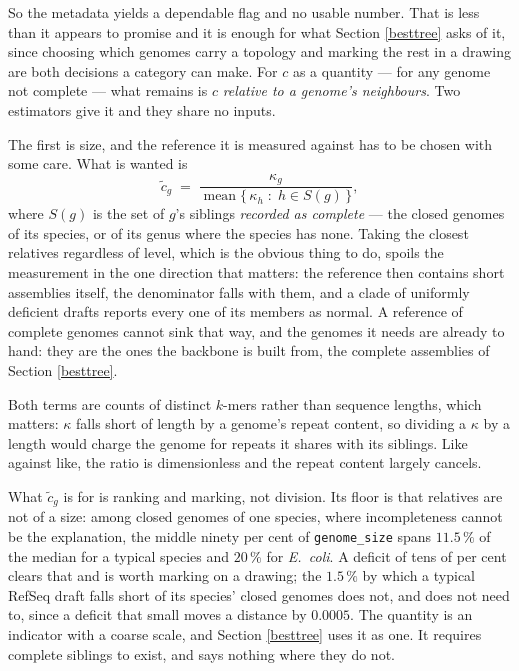 \documentclass[pdflatex,sn-vancouver-num]{sn-jnl}
\begin{document}
So the metadata yields a dependable flag and no usable number. That is less than it appears to promise
and it is enough for what Section \ref{besttree} asks of it, since choosing which genomes carry a
topology and marking the rest in a drawing are both decisions a category can make. For $c$ as a
quantity --- for any genome not complete --- what remains is $c$ \emph{relative to a genome's
neighbours}. Two estimators give it and they share no inputs.

The first is size, and the reference it is measured against has to be chosen with some care. What is
wanted is
%
\begin{equation}
  \tilde{c}_g \;=\; \frac{\kappa_g}{\operatorname{mean}\{\,\kappa_h \;:\; h \in S(g)\,\}} ,
  \label{cind}
\end{equation}
%
where $S(g)$ is the set of $g$'s siblings \emph{recorded as complete} --- the closed genomes of its
species, or of its genus where the species has none. Taking the closest relatives regardless of level,
which is the obvious thing to do, spoils the measurement in the one direction that matters: the
reference then contains short assemblies itself, the denominator falls with them, and a clade of
uniformly deficient drafts reports every one of its members as normal. A reference of complete genomes
cannot sink that way, and the genomes it needs are already to hand: they are the ones the backbone is built from, the
complete assemblies of Section \ref{besttree}.

Both terms are counts of distinct $k$-mers rather than sequence lengths, which matters: $\kappa$ falls
short of length by a genome's repeat content, so dividing a $\kappa$ by a length would charge the
genome for repeats it shares with its siblings. Like against like, the ratio is dimensionless and the
repeat content largely cancels.

What $\tilde{c}_g$ is for is ranking and marking, not division. Its floor is that relatives are not of
a size: among closed genomes of one species, where incompleteness cannot be the explanation, the middle
ninety per cent of \texttt{genome\_size} spans $11.5\,\%$ of the median for a typical species and
$20\,\%$ for \emph{E.~coli}. A deficit of tens of per cent clears that and is worth marking on a
drawing; the $1.5\,\%$ by which a typical RefSeq draft falls short of its species' closed genomes does
not, and does not need to, since a deficit that small moves a distance by $0.0005$. The quantity is an
indicator with a coarse scale, and Section \ref{besttree} uses it as one. It requires complete siblings
to exist, and says nothing where they do not.
\end{document}
